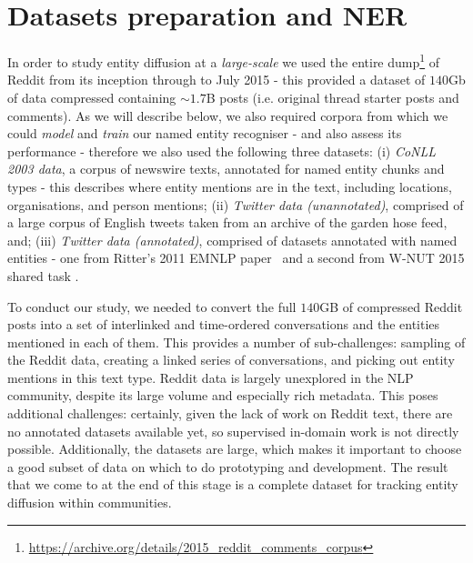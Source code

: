 \documentclass[10pt,journal,compsoc]{IEEEtran}
\begin{document}
%


\section{Datasets preparation and NER}
\label{sec:datasets_ner} 
In order to study entity diffusion at a \emph{large-scale} we used the entire dump\footnote{\url{https://archive.org/details/2015_reddit_comments_corpus}} of Reddit from its inception through to July 2015 - this provided a dataset of $140$Gb of data compressed containing $\sim1.7$B posts (i.e. original thread starter posts and comments).
As we will describe below, we also required corpora from which we could \emph{model} and \emph{train} our named entity recogniser - and also assess its performance - therefore we also used the following three datasets:
(i) \emph{CoNLL 2003 data}, a corpus of newswire texts, annotated for named entity chunks and types - this describes where entity mentions are in the text, including locations, organisations, and person mentions; 
(ii) \emph{Twitter data (unannotated)}, comprised of a large corpus of English tweets taken from an archive of the garden hose feed, and; 
(iii) \emph{Twitter data (annotated)}, comprised of datasets annotated with named entities - one from Ritter's 2011 EMNLP paper~\cite{ritter2011named} and a second from W-NUT 2015 shared task \cite{baldwin2015shared}.

To conduct our study, we needed to convert the full $140$GB of compressed Reddit posts into a set of interlinked and time-ordered conversations and the entities mentioned in each of them.
This provides a number of sub-challenges: sampling of the Reddit data, creating a linked series of conversations, and picking out entity mentions in this text type.
Reddit data is largely unexplored in the NLP community, despite its large volume and especially rich metadata.
This poses additional challenges: certainly, given the lack of work on Reddit text, there are no annotated datasets available yet, so supervised in-domain work is not directly possible.
Additionally, the datasets are large, which makes it important to choose a good subset of data on which to do prototyping and development.
The result that we come to at the end of this stage is a complete dataset for tracking entity diffusion within communities.
\end{document}
